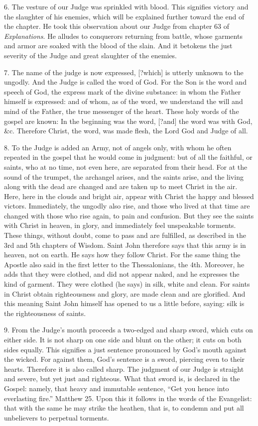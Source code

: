 6. The vesture of our Judge was sprinkled with blood. This signifies victory and the slaughter of his enemies, which will be explained further toward the end of the chapter. He took this observation about our Judge from chapter 63 of \textit{Explanations}. He alludes to conquerors returning from battle, whose garments and armor are soaked with the blood of the slain. And it betokens the just severity of the Judge and great slaughter of the enemies.

7. The name of the judge is now expressed, [?which] is utterly unknown to the ungodly. And the Judge is called the word of God. For the Son is the word and speech of God, the express mark of the divine substance: in whom the Father himself is expressed: and of whom, as of the word, we understand the will and mind of the Father, the true messenger of the heart. These holy words of the gospel are known: In the beginning was the word, [?and] the word was with God, \&c. Therefore Christ, the word, was made flesh, the Lord God and Judge of all.

8. To the Judge is added an Army, not of angels only, with whom he often repeated in the gospel that he would come in judgment: but of all the faithful, or saints, who at no time, not even here, are separated from their head. For at the sound of the trumpet, the archangel arises, and the saints arise, and the living along with the dead are changed and are taken up to meet Christ in the air. Here, here in the clouds and bright air, appear with Christ the happy and blessed victors. Immediately, the ungodly also rise, and those who lived at that time are changed with those who rise again, to pain and confusion. But they see the saints with Christ in heaven, in glory, and immediately feel unspeakable torments. These things, without doubt, come to pass and are fulfilled, as described in the 3rd and 5th chapters of Wisdom. Saint John therefore says that this army is in heaven, not on earth. He says how they follow Christ. For the same thing the Apostle also said in the first letter to the Thessalonians, the 4th. Moreover, he adds that they were clothed, and did not appear naked, and he expresses the kind of garment. They were clothed (he says) in silk, white and clean. For saints in Christ obtain righteousness and glory, are made clean and are glorified. And this meaning Saint John himself has opened to us a little before, saying: silk is the righteousness of saints.

9. From the Judge’s mouth proceeds a two-edged and sharp sword, which cuts on either side. It is not sharp on one side and blunt on the other; it cuts on both sides equally. This signifies a just sentence pronounced by God’s mouth against the wicked. For against them, God’s sentence is a sword, piercing even to their hearts. Therefore it is also called sharp. The judgment of our Judge is straight and severe, but yet just and righteous. What that sword is, is declared in the Gospel: namely, that heavy and immutable sentence, “Get you hence into everlasting fire.” Matthew 25. Upon this it follows in the words of the Evangelist: that with the same he may strike the heathen, that is, to condemn and put all unbelievers to perpetual torments.

